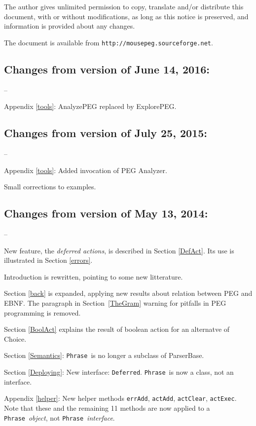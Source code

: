 \documentclass[a4paper,fleqn]{article}
\newcommand{\Phrase}{\tx{Phrase}}
\newcommand{\tx}[1]{\texttt{#1}}
\newcommand{\ul}
{\begin{list}
{--}
 {\setlength{\topsep}{0.5ex}
  \setlength{\itemsep}{0ex}
  \setlength{\parsep}{0ex}
  \setlength{\itemindent}{0em}
  \setlength{\labelwidth}{1em}
  \setlength{\labelsep}{0.5em}
  \setlength{\leftmargin}{1.5em}
 }
}
\newcommand{\eul}{\end{list}}
\begin{document}
\noindent
The author gives unlimited permission to copy, translate and/or distribute
this document, with or without modifications, 
as long as this notice is preserved,
and information is provided about any changes.

\noindent
The document is available from \tx{http://mousepeg.sourceforge.net}.
\newpage
\tableofcontents

\newpage
{}
\subsection*{Changes from version of June 14, 2016:}
\ul
\item Appendix \ref{tools}: AnalyzePEG replaced by ExplorePEG.
\eul
\subsection*{Changes from version of July 25, 2015:}
\ul
\item Appendix \ref{tools}: Added invocation of PEG Analyzer.
\item Small corrections to examples.
\eul
\subsection*{Changes from version of May 13, 2014:}
\ul
\item New feature, the \textit{deferred actions}, is described in Section \ref{DefAct}.
      Its use is illustrated in  Section \ref{errors}.
\item Introduction is rewritten, pointing to some new litterature.
\item Section \ref{back} is expanded, applying new results about relation between PEG and EBNF.\newline
      The paragraph in Section~\ref{TheGram} warning for pitfalls in PEG programming is removed.
\item Section \ref{BoolAct} explains the result of boolean action for an alternatve of Choice.
\item Section \ref{Semantics}: \Phrase\ is no longer a subclass of ParserBase.
\item Section \ref{Deploying}: New interface: \tx{Deferred}. \Phrase\ is now a class, not an interface.
\item Appendix \ref{helper}: New helper methods \tx{errAdd}, \tx{actAdd}, \tx{actClear}, \tx{actExec}.\newline
      Note that these and the remaining 11 methods are now applied to a \Phrase\ \textit{object},\newline
      not \Phrase\ \textit{interface}.
\eul
\end{document}
